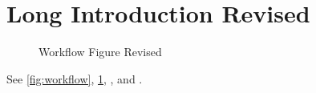 \section[Renamed Intro]{Long Introduction Revised}\label{sec:intro}
\begin{figure}\caption[Workflow Short Revised]{Workflow Figure Revised}\label{fig:workflow}\end{figure}
See \autoref{fig:workflow}, \cref{fig:workflow}, , and .
